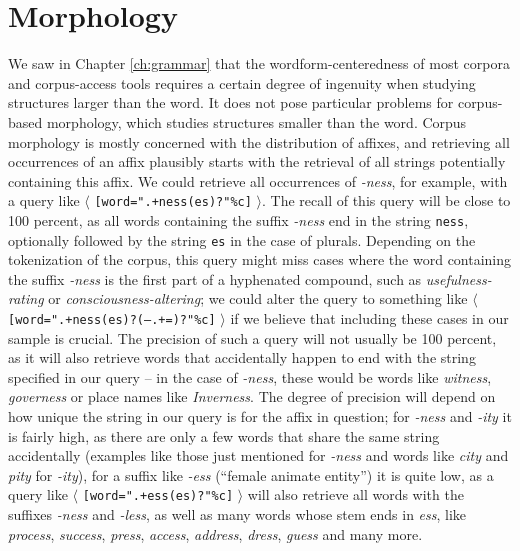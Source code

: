 \chapter{Morphology}
\label{ch:morphology}

We saw in Chapter \ref{ch:grammar} that the wordform-centeredness of most corpora and corpus-access tools requires a certain degree of ingenuity when studying structures larger than the word. It does not pose particular problems for corpus-based morphology, which studies structures smaller than the word. Corpus morphology is mostly concerned with the distribution of affixes, and retrieving all occurrences of an affix plausibly starts with the retrieval of all strings potentially containing this affix. We could retrieve all occurrences of \textit{-ness}, for example, with a query like $\langle$ \texttt{[word=".+ness(es)?"\%c]} $\rangle$. The recall of this query will be close to 100 percent, as all words containing the suffix \textit{-ness} end in the string \texttt{ness}, optionally followed by the string \texttt{es} in the case of plurals. Depending on the tokenization of the corpus, this query might miss cases where the word containing the suffix \textit{-ness} is the first part of a hyphenated compound, such as \textit{usefulness-rating} or \textit{consciousness-altering}; we could alter the query to something like $\langle$ \texttt{[word=".+ness(es)?(--.+=)?"\%c]} $\rangle$ if we believe that including these cases in our sample is crucial. The precision of such a query will not usually be 100 percent, as it will also retrieve words that accidentally happen to end with the string specified in our query -- in the case of \textit{-ness}, these would be words like \textit{witness}, \textit{governess} or place names like \textit{Inverness}. The degree of precision will depend on how unique the string in our query is for the affix in question; for \textit{-ness} and \textit{-ity} it is fairly high, as there are only a few words that share the same string accidentally (examples like those just mentioned for \textit{-ness} and words like \textit{city} and \textit{pity} for \textit{-ity}), for a suffix like \textit{-ess} (``female animate entity'') it is quite low, as a query like $\langle$ \texttt{[word=".+ess(es)?"\%c]} $\rangle$ will also retrieve all words with the suffixes \textit{-ness} and \textit{-less}, as well as many words whose stem ends in \textit{ess}, like \textit{process}, \textit{success}, \textit{press}, \textit{access}, \textit{address}, \textit{dress}, \textit{guess} and many more.

